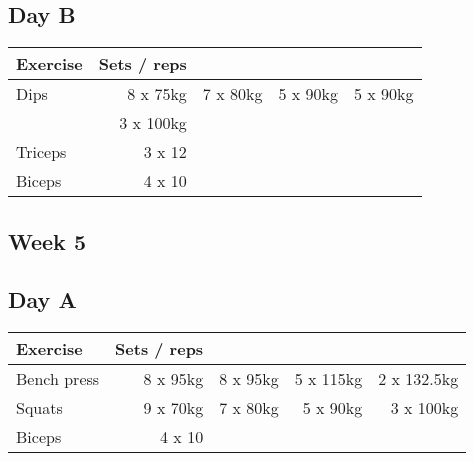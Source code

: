 \documentclass[12pt, a4paper]{article}%
\begin{document}
  \subsection*{\hspace{0.5em} Day B }


  \begin{tabular}{l|rrrr}
  \hspace{0.75em} \textbf{Exercise} & \textbf{Sets / reps} \\ \hline

            \hspace{0.75em} Dips
            & 8 x 75kg
            & 7 x 80kg
            & 5 x 90kg
            & 5 x 90kg
            \\


            \hspace{0.75em}
            & 3 x 100kg
            & 
            & 
            & 
            \\


   \hspace{0.75em} Triceps & 3 x 12 \\
   \hspace{0.75em} Biceps & 4 x 10 \\
  \end{tabular}

 \subsection*{\hspace{0.25em} Week 5 }
  \subsection*{\hspace{0.5em} Day A }


  \begin{tabular}{l|rrrr}
  \hspace{0.75em} \textbf{Exercise} & \textbf{Sets / reps} \\ \hline

            \hspace{0.75em} Bench press
            & 8 x 95kg
            & 8 x 95kg
            & 5 x 115kg
            & 2 x 132.5kg
            \\


            \hspace{0.75em} Squats
            & 9 x 70kg
            & 7 x 80kg
            & 5 x 90kg
            & 3 x 100kg
            \\


   \hspace{0.75em} Biceps & 4 x 10 \\
  \end{tabular}
\end{document}

